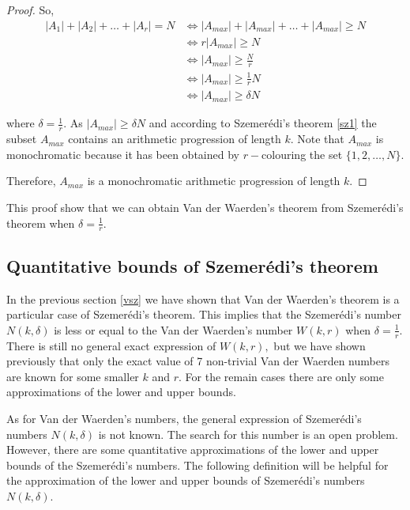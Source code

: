\begin{proof}
So, \begin{align*}
|A_1|+|A_2|+ \ldots +|A_r|=N & \Longleftrightarrow |A_{max}|+|A_{max}|+ \ldots +|A_{max}| \geq N \\  & \Longleftrightarrow r|A_{max}| \geq N \\
& \Longleftrightarrow |A_{max}| \geq \frac{N}{r}\\
&  \Longleftrightarrow |A_{max}| \geq \frac{1}{r} N \\ 
& \Longleftrightarrow |A_{max}| \geq \delta N\end{align*}

where $\delta = \frac{1}{r}$.
As $|A_{max}| \geq \delta N$ and according to Szemerédi's theorem \eqref{sz1} the subset $A_{max}$  contains an arithmetic progression of length $k.$
Note that $A_{max}$ is monochromatic because it has been obtained by $r-$colouring the set $\{1,2,\ldots, N\}.$

Therefore, $A_{max}$ is a monochromatic arithmetic progression of length $k.$
\end{proof}
This proof show that we can obtain Van der Waerden's theorem from   Szemerédi's theorem when $\delta= \frac{1}{r}.$


\subsection{Quantitative bounds of Szemerédi's theorem}

In the previous section \eqref{vsz} we have shown that Van der Waerden's theorem is a particular case of Szemerédi's theorem. This implies that the Szemerédi's number $N(k, \delta)$ is less or equal to the Van der Waerden's number $W(k,r)$ when $\delta=\frac{1}{r}.$
There is still no  general exact expression of $W(k,r),$ but  we have shown previously that only the exact value of 7 non-trivial Van der Waerden numbers are known for some smaller $k$ and $r$. For the remain cases there are only some  approximations of the lower and upper bounds. 

As for Van der Waerden's numbers,  the general expression of Szemerédi's numbers $N(k, \delta)$ is not known. The search for this number is an open problem. However, there are some quantitative approximations of the lower and upper bounds of the Szemerédi's numbers.  The following definition will be helpful for the approximation of the lower and upper bounds of Szemerédi's numbers $N(k, \delta)$.

